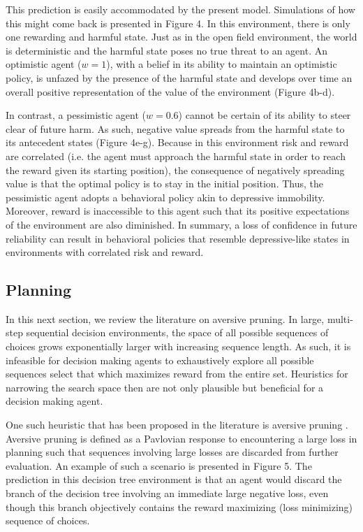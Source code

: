 \documentclass[11pt]{article} %
\begin{document}
This prediction is easily accommodated by the present model. Simulations of how this might come back is presented in Figure 4. In this environment, there is only one rewarding and harmful state. Just as in the open field environment, the world is deterministic and the harmful state poses no true threat to an agent. An optimistic agent ($w=1$), with a belief in its ability to maintain an optimistic policy, is unfazed by the presence of the harmful state and develops over time an overall positive representation of the value of the environment (Figure 4b-d).

In contrast, a pessimistic agent ($w=0.6$) cannot be certain of its ability to steer clear of future harm. As such, negative value spreads from the harmful state to its antecedent states (Figure 4e-g). Because in this environment risk and reward are correlated (i.e. the agent must approach the harmful state in order to reach the reward given its starting position), the consequence of negatively spreading value is that the optimal policy is to stay in the initial position. Thus, the pessimistic agent adopts a behavioral policy akin to depressive immobility. Moreover, reward is inaccessible to this agent such that its positive expectations of the environment are also diminished. In summary, a loss of confidence in future reliability can result in behavioral policies that resemble depressive-like states in environments with correlated risk and reward.

\subsection{Planning}

In this next section, we review the literature on aversive pruning. In large, multi-step sequential decision environments, the space of all possible sequences of choices grows exponentially larger with increasing sequence length. As such, it is infeasible for decision making agents to exhaustively explore all possible sequences select that which maximizes reward from the entire set. Heuristics for narrowing the search space then are not only plausible but beneficial for a decision making agent.

One such heuristic that has been proposed in the literature is aversive pruning \citep{Huys2012}. Aversive pruning is defined as a Pavlovian response to encountering a large loss in planning such that sequences involving large losses are discarded from further evaluation. An example of such a scenario is presented in Figure 5. The prediction in this decision tree environment is that an agent would discard the branch of the decision tree involving an immediate large negative loss, even though this branch objectively contains the reward maximizing (loss minimizing) sequence of choices.
\end{document}
